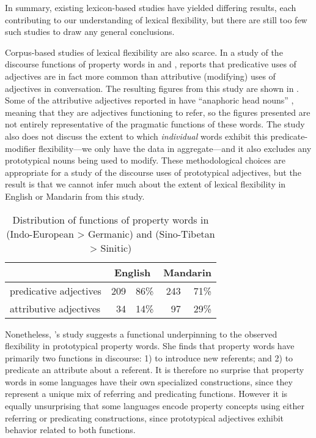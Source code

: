 In summary, existing lexicon-based studies have yielded differing results, each contributing to our understanding of lexical flexibility, but there are still too few such studies to draw any general conclusions.

Corpus-based studies of lexical flexibility are also scarce. In a study of the discourse functions of property words in  and , \textcite{Thompson1989} reports that predicative uses of adjectives are in fact more common than attributive (modifying) uses of adjectives in conversation. The resulting figures from this study are shown in . Some of the attributive adjectives reported in  have \enquote{anaphoric head nouns} \parencite[258]{Thompson1989}, meaning that they are adjectives functioning to refer, so the figures presented are not entirely representative of the pragmatic functions of these words. The study also does not discuss the extent to which \emph{individual} words exhibit this predicate-modifier flexibility—we only have the data in aggregate—and it also excludes any prototypical nouns being used to modify. These methodological choices are appropriate for a study of the discourse uses of prototypical adjectives, but the result is that we cannot infer much about the extent of lexical flexibility in English or Mandarin from this study.

\begin{table}[h]
  \centering
  \caption[Distribution of functions of property words in English (Indo-European > Germanic) and Mandarin (Sino-Tibetan > Sinitic)]{Distribution of functions of property words in  (Indo-European > Germanic) and  (Sino-Tibetan > Sinitic) \parencite[253, 257]{Thompson1989}}
  \label{tab:Thompson-1989}
  \begin{tabular}{ l r r r r }
    \toprule
      {                    } & \multicolumn{2}{c}{English} & \multicolumn{2}{c}{Mandarin} \\
    \midrule
      predicative adjectives & 209 & 86\%                  & 243 & 71\% \\
      attributive adjectives &  34 & 14\%                  &  97 & 29\% \\
    \bottomrule
  \end{tabular}
\end{table}

Nonetheless, \citeauthor{Thompson1989}'s study suggests a functional underpinning to the observed flexibility in prototypical property words. She finds that property words have primarily two functions in discourse: 1) to introduce new referents; and 2) to predicate an attribute about a referent. It is therefore no surprise that property words in some languages have their own specialized constructions, since they represent a unique mix of referring and predicating functions. However it is equally unsurprising that some languages encode property concepts using either referring or predicating constructions, since prototypical adjectives exhibit behavior related to both functions.

